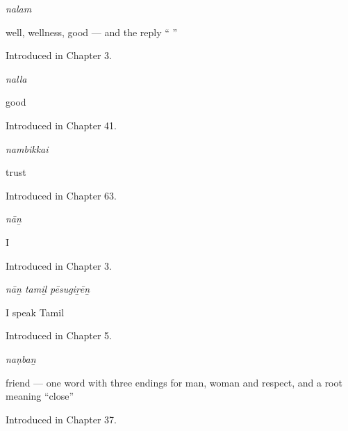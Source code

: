 \noindent\begin{minipage}[t]{\linewidth}
\raggedright
\textbf{}\enspace\emph{nalam}\par
\small well, wellness, good — and the reply \textquotedblleft{}  \textquotedblright{}\par
\footnotesize Introduced in Chapter 3.
\end{minipage}\par\medskip

\noindent\begin{minipage}[t]{\linewidth}
\raggedright
\textbf{}\enspace\emph{nalla}\par
\small good\par
\footnotesize Introduced in Chapter 41.
\end{minipage}\par\medskip

\noindent\begin{minipage}[t]{\linewidth}
\raggedright
\textbf{}\enspace\emph{nambikkai}\par
\small trust\par
\footnotesize Introduced in Chapter 63.
\end{minipage}\par\medskip

\noindent\begin{minipage}[t]{\linewidth}
\raggedright
\textbf{}\enspace\emph{nāṉ}\par
\small I\par
\footnotesize Introduced in Chapter 3.
\end{minipage}\par\medskip

\noindent\begin{minipage}[t]{\linewidth}
\raggedright
\textbf{  }\enspace\emph{nāṉ tamiḻ pēsugiṟēṉ}\par
\small I speak Tamil\par
\footnotesize Introduced in Chapter 5.
\end{minipage}\par\medskip

\noindent\begin{minipage}[t]{\linewidth}
\raggedright
\textbf{}\enspace\emph{naṇbaṉ}\par
\small friend — one word with three endings for man, woman and respect, and a root meaning \textquotedblleft{}close\textquotedblright{}\par
\footnotesize Introduced in Chapter 37.
\end{minipage}\par\medskip

